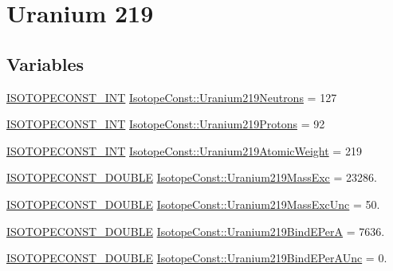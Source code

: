 \hypertarget{group___isotope_const-_uranium-_u219}{}\section{Uranium 219}
\label{group___isotope_const-_uranium-_u219}
\subsection*{Variables}
\begin{DoxyCompactItemize}
\item 
\mbox{\hyperlink{group___isotope_const-_macros_ga5f18360b3e99483a35c32d789e62621c}{I\+S\+O\+T\+O\+P\+E\+C\+O\+N\+S\+T\+\_\+\+I\+NT}} \mbox{\hyperlink{group___isotope_const-_uranium-_u219_ga17fe80a3d6932756f75ac8b83b810333}{Isotope\+Const\+::\+Uranium219\+Neutrons}} = 127
\item 
\mbox{\hyperlink{group___isotope_const-_macros_ga5f18360b3e99483a35c32d789e62621c}{I\+S\+O\+T\+O\+P\+E\+C\+O\+N\+S\+T\+\_\+\+I\+NT}} \mbox{\hyperlink{group___isotope_const-_uranium-_u219_ga9c989e5b477c06b09cfb70074af46a3f}{Isotope\+Const\+::\+Uranium219\+Protons}} = 92
\item 
\mbox{\hyperlink{group___isotope_const-_macros_ga5f18360b3e99483a35c32d789e62621c}{I\+S\+O\+T\+O\+P\+E\+C\+O\+N\+S\+T\+\_\+\+I\+NT}} \mbox{\hyperlink{group___isotope_const-_uranium-_u219_ga6e77620a7d31d2f3f53faa1c7d02b795}{Isotope\+Const\+::\+Uranium219\+Atomic\+Weight}} = 219
\item 
\mbox{\hyperlink{group___isotope_const-_macros_ga8f45a7272ce02c0b4c65c44636ed719a}{I\+S\+O\+T\+O\+P\+E\+C\+O\+N\+S\+T\+\_\+\+D\+O\+U\+B\+LE}} \mbox{\hyperlink{group___isotope_const-_uranium-_u219_ga6ee597f2b652e8d782e50cb983af042c}{Isotope\+Const\+::\+Uranium219\+Mass\+Exc}} = 23286.
\item 
\mbox{\hyperlink{group___isotope_const-_macros_ga8f45a7272ce02c0b4c65c44636ed719a}{I\+S\+O\+T\+O\+P\+E\+C\+O\+N\+S\+T\+\_\+\+D\+O\+U\+B\+LE}} \mbox{\hyperlink{group___isotope_const-_uranium-_u219_gaf71bb6525b5aebb57bdfbd27e39a7f87}{Isotope\+Const\+::\+Uranium219\+Mass\+Exc\+Unc}} = 50.
\item 
\mbox{\hyperlink{group___isotope_const-_macros_ga8f45a7272ce02c0b4c65c44636ed719a}{I\+S\+O\+T\+O\+P\+E\+C\+O\+N\+S\+T\+\_\+\+D\+O\+U\+B\+LE}} \mbox{\hyperlink{group___isotope_const-_uranium-_u219_ga485a6cc3b8aed4742d2b865bf8f37022}{Isotope\+Const\+::\+Uranium219\+Bind\+E\+PerA}} = 7636.
\item 
\mbox{\hyperlink{group___isotope_const-_macros_ga8f45a7272ce02c0b4c65c44636ed719a}{I\+S\+O\+T\+O\+P\+E\+C\+O\+N\+S\+T\+\_\+\+D\+O\+U\+B\+LE}} \mbox{\hyperlink{group___isotope_const-_uranium-_u219_ga86ba7cd5548b8d5fa94d59ad913ca361}{Isotope\+Const\+::\+Uranium219\+Bind\+E\+Per\+A\+Unc}} = 0.

\end{DoxyCompactItemize}
